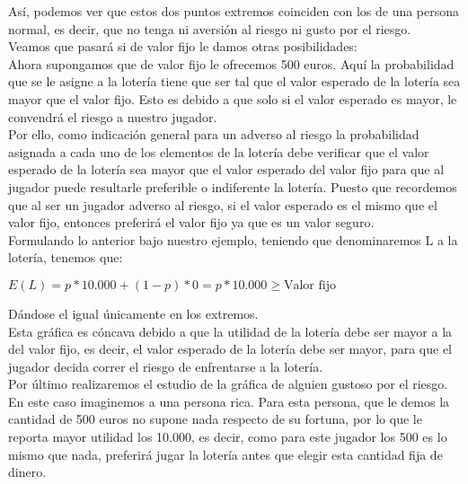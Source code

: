 \documentclass[10pt,a4paper]{book}
\begin{document}
Así, podemos ver que estos dos puntos extremos coinciden con los de una persona normal, es decir, que no tenga ni aversión al riesgo ni gusto por el riesgo.\\

Veamos que pasará si de valor fijo le damos otras posibilidades:\\

Ahora supongamos que de valor fijo le ofrecemos 500 euros. Aquí la probabilidad que se le asigne a la lotería tiene que ser tal que el valor esperado de la lotería sea mayor que el valor fijo. Esto es debido a que solo si el valor esperado es mayor, le convendrá el riesgo a nuestro jugador. \\ 

Por ello, como indicación general para un adverso al riesgo la probabilidad asignada a cada uno de los elementos de la lotería debe verificar que el valor esperado de la lotería sea mayor que el valor esperado del valor fijo para que al jugador puede resultarle preferible o indiferente la lotería. Puesto que recordemos que al ser un jugador adverso al riesgo, si el valor esperado es el mismo que el valor fijo, entonces preferirá el valor fijo ya que es un valor seguro.\\

Formulando lo anterior bajo nuestro ejemplo, teniendo que denominaremos L a la lotería, tenemos que:\\

\begin{center}

$E(L)=p*10.000 +(1-p)*0 = p*10.000 \geq \mbox{Valor fijo}$

\end{center}

Dándose el igual únicamente en los extremos. \\

Esta gráfica es cóncava debido a que la utilidad de la lotería debe ser mayor a la del valor fijo, es decir, el valor esperado de la lotería debe ser mayor, para que el jugador decida correr el riesgo de enfrentarse a la lotería.\\

Por último realizaremos el estudio de la gráfica de alguien gustoso por el riesgo.\\

En este caso imaginemos a una persona rica. Para esta persona, que le demos la cantidad de 500 euros no supone nada respecto de su fortuna, por lo que le reporta mayor utilidad los 10.000, es decir, como para este jugador los 500 es lo mismo que nada, preferirá jugar la lotería antes que elegir esta cantidad fija de dinero.\\
\end{document}
